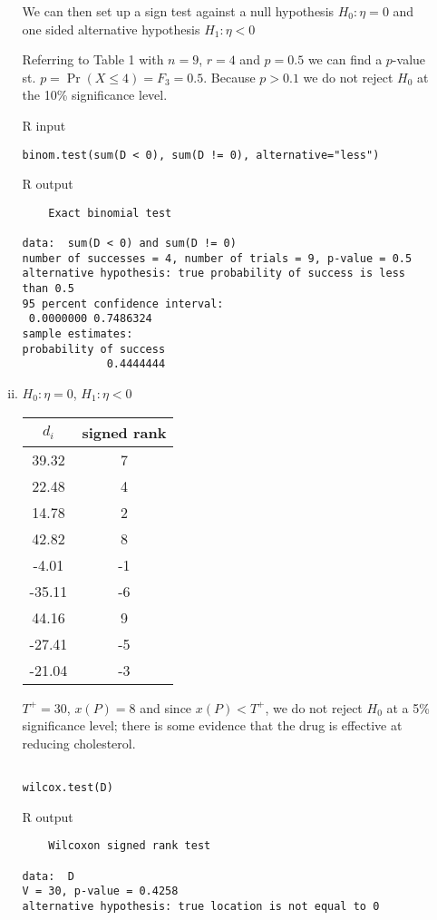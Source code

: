 \documentclass[10pt]{article}
\begin{document}
\begin{enumerate}
\begin{enumerate}[(i)]
                    We can then set up a sign test against a null hypothesis
                    $H_0: \eta = 0$ and one sided alternative hypothesis $H_1:
                    \eta < 0$

                    Referring to Table 1 with $n = 9$, $r = 4$ and $p = 0.5$ we
                    can find a $p$-value st. $p = \Pr(X \leq 4) = F_3 = 0.5$.
                    Because $p > 0.1$ we do not reject $H_0$ at the 10\%
                    significance level.

                    \pagebreak

                    R input
                    \begin{verbatim}
binom.test(sum(D < 0), sum(D != 0), alternative="less")
                    \end{verbatim}

                    R output
                    \begin{verbatim}
	Exact binomial test

data:  sum(D < 0) and sum(D != 0)
number of successes = 4, number of trials = 9, p-value = 0.5
alternative hypothesis: true probability of success is less than 0.5
95 percent confidence interval:
 0.0000000 0.7486324
sample estimates:
probability of success
             0.4444444
                    \end{verbatim}
                \item 
                    $H_0 : \eta = 0$, $H_1: \eta < 0$

    \begin{tabular}{ c c }
        $d_i$ & signed rank \\
        \hline
        39.32 & 7 \\
        22.48 & 4 \\
        14.78 & 2 \\
        42.82 & 8 \\
        -4.01 & -1 \\
        -35.11 & -6 \\
        44.16 & 9 \\
        -27.41 & -5 \\
        -21.04 & -3 \\
    \end{tabular}

    $T^+ = 30$, $x(P) = 8$ and since $x(P) < T^+$, we do not reject $H_0$ at a
    5\% significance level; there is some evidence that the drug is effective
    at reducing cholesterol.

                    \begin{verbatim}

wilcox.test(D)
                    \end{verbatim}

                    R output
                    \begin{verbatim}
	Wilcoxon signed rank test

data:  D
V = 30, p-value = 0.4258
alternative hypothesis: true location is not equal to 0
                    \end{verbatim}
            \end{enumerate}
    \end{enumerate}
\end{document}
